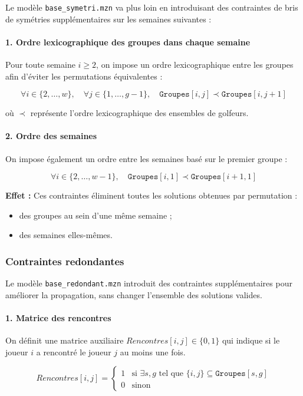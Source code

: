 \documentclass{article}
\begin{document}
Le modèle \texttt{base\_symetri.mzn} va plus loin en introduisant des contraintes de bris de symétries supplémentaires sur les semaines suivantes :

\paragraph{1. Ordre lexicographique des groupes dans chaque semaine}
Pour toute semaine $i \ge 2$, on impose un ordre lexicographique entre les groupes afin d’éviter les permutations équivalentes :

\[
\forall i \in \{2, \dots, w\}, \quad \forall j \in \{1, \dots, g-1\}, \quad
\texttt{Groupes}[i,j] \prec \texttt{Groupes}[i,j+1]
\]

où $\prec$ représente l’ordre lexicographique des ensembles de golfeurs.

\paragraph{2. Ordre des semaines}
On impose également un ordre entre les semaines basé sur le premier groupe :

\[
\forall i \in \{2, \dots, w-1\}, \quad
\texttt{Groupes}[i,1] \prec \texttt{Groupes}[i+1,1]
\]

\noindent
\textbf{Effet :} Ces contraintes éliminent toutes les solutions obtenues par permutation :
\begin{itemize}
    \item des groupes au sein d’une même semaine ;
    \item des semaines elles-mêmes.
\end{itemize}


\subsubsection{Contraintes redondantes}

Le modèle \texttt{base\_redondant.mzn} introduit des contraintes supplémentaires pour améliorer la propagation, sans changer l’ensemble des solutions valides.

\paragraph{1. Matrice des rencontres}
On définit une matrice auxiliaire $Rencontres[i,j] \in \{0,1\}$ qui indique si le joueur $i$ a rencontré le joueur $j$ au moins une fois.  

\[
Rencontres[i,j] = 
\begin{cases}
1 & \text{si } \exists s,g \text{ tel que } \{i,j\} \subseteq \texttt{Groupes}[s,g] \\
0 & \text{sinon}
\end{cases}
\]
\end{document}
